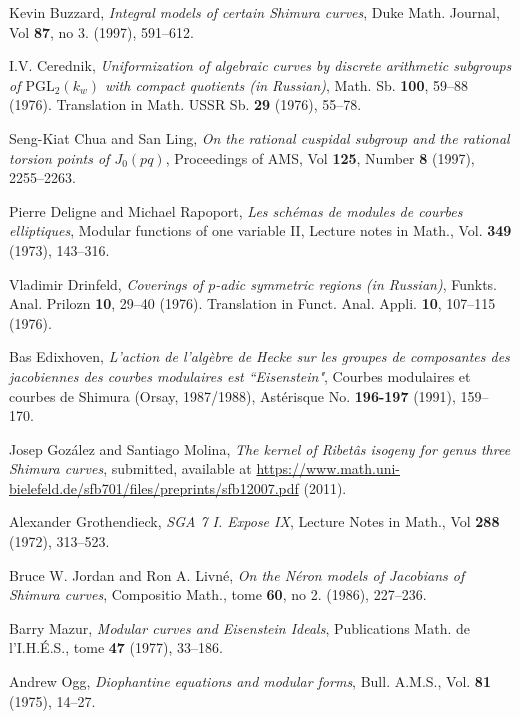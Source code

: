 \documentclass[a4paper, 12pt]{amsart}
\theoremstyle{definition}
\theoremstyle{remark}
\numberwithin{equation}{section} \numberwithin{table}{section}
\begin{document}
\begin{thebibliography}{99}

 Kevin Buzzard, \emph{Integral models of certain Shimura curves}, Duke Math. Journal, Vol \textbf{87}, no 3. (1997), 591--612.
    

 I.V. Cerednik, \emph{Uniformization of algebraic curves by discrete arithmetic subgroups of $\mathrm{PGL}_2(k_w)$ with compact quotients (in Russian)}, Math. Sb. \textbf{100}, 59--88 (1976). Translation in Math. USSR Sb. \textbf{29} (1976), 55--78.

 Seng-Kiat Chua and San Ling, \emph{On the rational cuspidal subgroup and the rational torsion points of $J_0(pq)$}, Proceedings of AMS, Vol \textbf{125}, Number \textbf{8} (1997), 2255--2263.

 Pierre Deligne and Michael Rapoport, \emph{Les sch\'emas de modules de courbes elliptiques}, Modular functions of one variable II, Lecture notes in Math., Vol. \textbf{349} (1973), 143--316.

 Vladimir Drinfeld, \emph{Coverings of $p$-adic symmetric regions (in Russian)}, Funkts. Anal. Prilozn \textbf{10}, 29--40 (1976). Translation in Funct. Anal. Appli. \textbf{10}, 107--115 (1976).

 Bas Edixhoven, \emph{L'action de l'alg\`ebre de Hecke sur les groupes de composantes des jacobiennes des courbes modulaires est ``Eisenstein"}, Courbes modulaires et courbes de Shimura (Orsay, 1987/1988), Ast\'erisque No. \textbf{196-197} (1991), 159--170.

 Josep Goz\'alez and Santiago Molina, \emph{The kernel of Ribetâs isogeny for genus three Shimura curves}, submitted, available at \url{https://www.math.uni-bielefeld.de/sfb701/files/preprints/sfb12007.pdf} (2011). 

 Alexander Grothendieck, \emph{SGA 7 I. Expose IX}, Lecture Notes in Math., Vol \textbf{288} (1972), 313--523.

 Bruce W. Jordan and Ron A. Livn\'e, \emph{On the N\'eron models of Jacobians of Shimura curves}, Compositio Math., tome \textbf{60}, no 2. (1986), 227--236.

 Barry Mazur, \emph{Modular curves and Eisenstein Ideals}, Publications Math. de l'I.H.\'E.S., tome \textbf{47} (1977), 33--186.

 Andrew Ogg, \emph{Diophantine equations and modular forms}, Bull. A.M.S., Vol. \textbf{81} (1975), 14--27.


\end{thebibliography}
\end{document}
